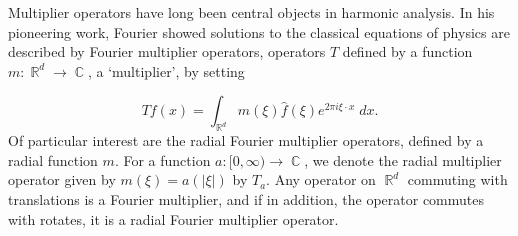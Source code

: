 \documentclass[11pt]{article}
\DeclareMathOperator{\RR}{\mathbb{R}}
\DeclareMathOperator{\CC}{\mathbb{C}}
\begin{document}

Multiplier operators have long been central objects in harmonic analysis. %
In his pioneering work, Fourier showed solutions to the classical equations of physics are described by Fourier multiplier operators, operators $T$ defined by a function $m: \RR^d \to \CC$, a `multiplier', by setting

%
\[ Tf(x) = \int_{\RR^d} m(\xi) \widehat{f}(\xi) e^{2 \pi i \xi \cdot x}\; dx. \]
%
Of particular interest are the radial Fourier multiplier operators, defined by a radial function $m$. For a function $a: [0,\infty) \to \CC$, we denote the radial multiplier operator given by $m(\xi) = a(|\xi|)$ by $T_a$. Any operator on $\RR^d$ commuting with translations is a Fourier multiplier, and if in addition, the operator commutes with rotates, it is a radial Fourier multiplier operator. %
\end{document}
